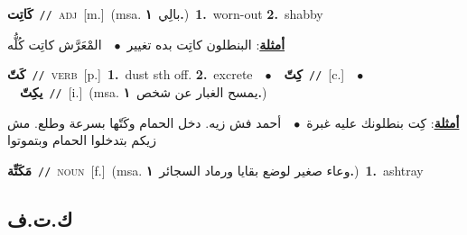 \documentclass[10pt,a4paper,twoside]{article} %
\begin{document}
\begin{multicols}{2}
{\setlength\topsep{0pt}\textbf{\foreignlanguage{arabic}{كَاتِت}}\ {\color{gray}\texttt{//}\color{black}}\ \textsc{adj}\ [m.]\ \color{gray}(msa. \foreignlanguage{arabic}{بالِي}~\foreignlanguage{arabic}{\textbf{١.}})\color{black}\ \textbf{1.}~worn-out  \textbf{2.}~shabby\  \begin{flushright}\color{gray}\foreignlanguage{arabic}{\textbf{\underline{\foreignlanguage{arabic}{أمثلة}}}: البنطلون كاتِت بده تغيير\ $\bullet$\ \  المْعَرَّش كاتِت كُلُّه}\end{flushright}\color{black}} \vspace{2mm}

{\setlength\topsep{0pt}\textbf{\foreignlanguage{arabic}{كَتّ}}\ {\color{gray}\texttt{//}\color{black}}\ \textsc{verb}\ [p.]\ \textbf{1.}~dust sth off.  \textbf{2.}~excrete\ \ $\bullet$\ \ \setlength\topsep{0pt}\textbf{\foreignlanguage{arabic}{كِتّ}}\ {\color{gray}\texttt{//}\color{black}}\ [c.]\ \ $\bullet$\ \ \setlength\topsep{0pt}\textbf{\foreignlanguage{arabic}{يكِتّ}}\ {\color{gray}\texttt{//}\color{black}}\ [i.]\ \color{gray}(msa. \foreignlanguage{arabic}{يمسح الغبار عن شخص}~\foreignlanguage{arabic}{\textbf{١.}})\color{black}\  \begin{flushright}\color{gray}\foreignlanguage{arabic}{\textbf{\underline{\foreignlanguage{arabic}{أمثلة}}}: كِت بنطلونك عليه غبرة\ $\bullet$\ \  أحمد فش زيه. دخل الحمام وكَتّها بسرعة وطلع. مش زيكم بتدخلوا الحمام وبتموتوا}\end{flushright}\color{black}} \vspace{2mm}

{\setlength\topsep{0pt}\textbf{\foreignlanguage{arabic}{مَكَتِّة}}\ {\color{gray}\texttt{//}\color{black}}\ \textsc{noun}\ [f.]\ \color{gray}(msa. \foreignlanguage{arabic}{وعاء صغير لوضع بقايا ورماد السجائر}~\foreignlanguage{arabic}{\textbf{١.}})\color{black}\ \textbf{1.}~ashtray\ } \vspace{2mm}

\vspace{-3mm}
\subsection*{\color{blue}\foreignlanguage{arabic}{ك.ت.ف}\color{blue}{}} 


\end{multicols}
\end{document}
